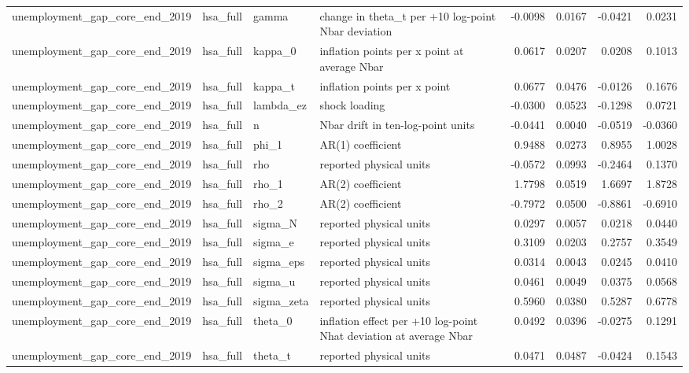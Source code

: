 \begin{tabular}{llllrrrr}
unemployment\_gap\_core\_end\_2019 & hsa\_full & gamma & change in theta\_t per +10 log-point Nbar deviation & -0.0098 & 0.0167 & -0.0421 & 0.0231 \\
unemployment\_gap\_core\_end\_2019 & hsa\_full & kappa\_0 & inflation points per x point at average Nbar & 0.0617 & 0.0207 & 0.0208 & 0.1013 \\
unemployment\_gap\_core\_end\_2019 & hsa\_full & kappa\_t & inflation points per x point & 0.0677 & 0.0476 & -0.0126 & 0.1676 \\
unemployment\_gap\_core\_end\_2019 & hsa\_full & lambda\_ez & shock loading & -0.0300 & 0.0523 & -0.1298 & 0.0721 \\
unemployment\_gap\_core\_end\_2019 & hsa\_full & n & Nbar drift in ten-log-point units & -0.0441 & 0.0040 & -0.0519 & -0.0360 \\
unemployment\_gap\_core\_end\_2019 & hsa\_full & phi\_1 & AR(1) coefficient & 0.9488 & 0.0273 & 0.8955 & 1.0028 \\
unemployment\_gap\_core\_end\_2019 & hsa\_full & rho & reported physical units & -0.0572 & 0.0993 & -0.2464 & 0.1370 \\
unemployment\_gap\_core\_end\_2019 & hsa\_full & rho\_1 & AR(2) coefficient & 1.7798 & 0.0519 & 1.6697 & 1.8728 \\
unemployment\_gap\_core\_end\_2019 & hsa\_full & rho\_2 & AR(2) coefficient & -0.7972 & 0.0500 & -0.8861 & -0.6910 \\
unemployment\_gap\_core\_end\_2019 & hsa\_full & sigma\_N & reported physical units & 0.0297 & 0.0057 & 0.0218 & 0.0440 \\
unemployment\_gap\_core\_end\_2019 & hsa\_full & sigma\_e & reported physical units & 0.3109 & 0.0203 & 0.2757 & 0.3549 \\
unemployment\_gap\_core\_end\_2019 & hsa\_full & sigma\_eps & reported physical units & 0.0314 & 0.0043 & 0.0245 & 0.0410 \\
unemployment\_gap\_core\_end\_2019 & hsa\_full & sigma\_u & reported physical units & 0.0461 & 0.0049 & 0.0375 & 0.0568 \\
unemployment\_gap\_core\_end\_2019 & hsa\_full & sigma\_zeta & reported physical units & 0.5960 & 0.0380 & 0.5287 & 0.6778 \\
unemployment\_gap\_core\_end\_2019 & hsa\_full & theta\_0 & inflation effect per +10 log-point Nhat deviation at average Nbar & 0.0492 & 0.0396 & -0.0275 & 0.1291 \\
unemployment\_gap\_core\_end\_2019 & hsa\_full & theta\_t & reported physical units & 0.0471 & 0.0487 & -0.0424 & 0.1543 \\

\end{tabular}
